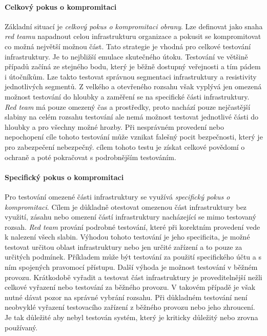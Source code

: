 \paragraph{Celkový pokus o kompromitaci}
Základní situací je \textit{celkový pokus o kompromitaci obrany}.
Lze definovat jako snaha \textit{red teamu} napadnout celou infrastrukturu organizace a pokusit se kompromitovat co možná největší možnou část.
Tato strategie je vhodná pro celkové testování infrastruktury.
Je to nejbližší emulace skutečného útoku.
Testování ve většině případů začíná ze stejného bodu, který je běžně dostupný veřejnosti a tím pádem i útočníkům.
Lze takto testovat správnou segmentaci infrastruktury a resistivity jednotlivých segmentů.
Z velkého a otevřeného rozsahu však vyplývá jen omezená možnost testování do hloubky a zaměření se na specifické části infrastruktury.
\textit{Red team} má pouze omezený čas a prostředky, proto nachází pouze nejčastější slabiny na celém rozsahu testování ale nemá možnost testovat jednotlivé části do hloubky a pro všechny možné hrozby.
Při nesprávném provedení nebo nepochopení cíle tohoto testování může vznikat falešný pocit bezpečnosti, který je pro zabezpečení nebezpečný.
cílem tohoto testu je získat celkové povědomí o ochraně a poté pokračovat s podrobnějším testováním.

\paragraph{Specifický pokus o kompromitaci}
Pro testování omezené části infrastruktury se využívá \textit{specifický pokus o kompromitaci}.
Cílem je důkladně otestovat omezenou část infrastruktury bez využití, zásahu nebo omezení částí infrastruktury nacházející se mimo testovaný rozsah.
\textit{Red team} prování podrobné testování, které při korektním provedení vede k nalezení všech slabin.
Výhodou tohoto testování je jeho specificita, je možné testovat určitou oblast infrastruktury nebo jen určité zařízení a to pouze za určitých podmínek.
Příkladem může být testování za použití specifického účtu a s ním spojených pravomocí přístupu.
Další výhoda je možnost testování v běžném provozu.
Krátkodobě vyřadit a testovat část infrastruktury je proveditelnější nežli celkové vyřazení nebo testování za běžného provozu.
V takovém případě je však nutné dávat pozor na správné vybrání rozsahu.
Při důkladném testování není neobvyklé vyřazení testovacího zařízení z běžného provozu nebo jeho zhroucení.
Je tak důležité aby nebyl testován systém, který je kriticky důležitý nebo zrovna používaný.


